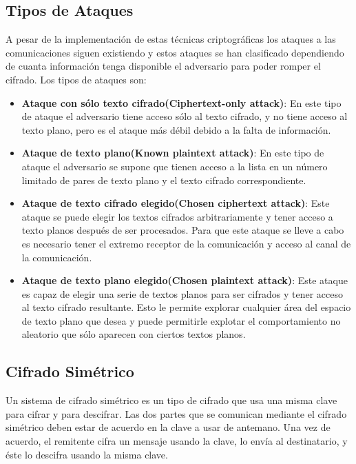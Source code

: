 \documentclass[12pt,oneside,onecolumn,openany]{report}
\begin{document}
\subsection{Tipos de Ataques}
A  pesar  de  la  implementación  de  estas  técnicas  criptográficas  los  ataques  a  las comunicaciones  siguen  existiendo  y  estos  ataques  se  han  clasificado  dependiendo  de 
cuanta  información  tenga  disponible  el  adversario  para  poder  romper  el  cifrado.\cite{at} Los tipos de ataques son:
\begin{itemize}
 \item \textbf{Ataque con sólo texto cifrado(Ciphertext-only  attack)}: En este tipo de ataque el adversario tiene acceso sólo al texto cifrado, y no tiene acceso al texto plano, pero es el ataque más débil debido a la falta de información.
 \item \textbf{Ataque de texto plano(Known plaintext attack)}: En este tipo de ataque el adversario se supone que tienen acceso a la lista en un número limitado de pares de texto plano y el texto cifrado correspondiente.
 \item \textbf{Ataque de texto cifrado elegido(Chosen ciphertext attack)}: Este ataque se puede elegir los textos cifrados arbitrariamente y tener acceso a texto planos después de ser procesados. Para que este ataque se lleve a cabo es necesario tener el extremo receptor de la comunicación y acceso al canal de la comunicación.
 \item \textbf{Ataque de texto plano elegido(Chosen plaintext attack)}: Este ataque es capaz de elegir una serie de textos planos para ser cifrados y tener acceso al texto cifrado resultante. Esto le permite explorar cualquier área del espacio de  texto plano que desea y puede permitirle explotar el comportamiento no aleatorio que sólo aparecen con ciertos textos planos.
\end{itemize}




\subsection{Cifrado Simétrico}
Un sistema de cifrado simétrico es un tipo de cifrado que usa una misma clave para cifrar y para descifrar. Las dos partes que se comunican mediante el cifrado simétrico deben estar de acuerdo en la clave a usar de antemano. Una vez de acuerdo, el remitente cifra un mensaje usando la clave, lo envía al destinatario, y éste lo descifra usando la misma clave.\cite{sime}\\
\end{document}
